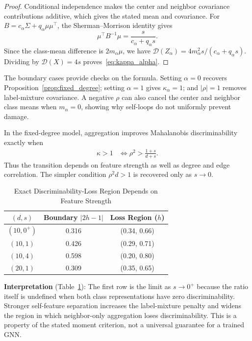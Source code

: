 \begin{proof}
Conditional independence makes the center and neighbor covariance contributions additive, which gives the stated mean and covariance. For
$B=c_\alpha\Sigma+q_\alpha\mu\mu^\top$, the Sherman--Morrison identity gives
\begin{equation}
    \mu^\top B^{-1}\mu=\frac{s}{c_\alpha+q_\alpha s}.
\end{equation}
Since the class-mean difference is $2m_\alpha\mu$, we have
$\mathcal{D}(Z_\alpha)=4m_\alpha^2s/(c_\alpha+q_\alpha s)$. Dividing by $\mathcal{D}(X)=4s$ proves~\eqref{eq:kappa_alpha}.
\end{proof}

The boundary cases provide checks on the formula. Setting $\alpha=0$ recovers Proposition~\ref{prop:fixed_degree}; setting $\alpha=1$ gives $\kappa_\alpha=1$; and $|\rho|=1$ removes label-mixture covariance. A negative $\rho$ can also cancel the center and neighbor class means when $m_\alpha=0$, showing why self-loops do not uniformly prevent damage.

\begin{corollary}
\label{cor:threshold}
In the fixed-degree model, aggregation improves Mahalanobis discriminability exactly when
\begin{align}
    \kappa>1
    &\iff \rho^2 > \frac{1+s}{d+s}.
\end{align}
Thus the transition depends on feature strength as well as degree and edge correlation. The simpler condition $\rho^2d>1$ is recovered only as $s\to0$.
\end{corollary}

\begin{table}[t]
\centering
\caption{Exact Discriminability-Loss Region Depends on Feature Strength}
\label{tab:threshold}
\begin{tabular}{@{}ccc@{}}
\toprule
$(d,s)$ & Boundary $|2h-1|$ & Loss Region ($h$) \\
\midrule
$(10,0^+)$ & 0.316 & (0.34, 0.66) \\
$(10,1)$ & 0.426 & (0.29, 0.71) \\
$(10,4)$ & 0.598 & (0.20, 0.80) \\
$(20,1)$ & 0.309 & (0.35, 0.65) \\
\bottomrule
\end{tabular}
\end{table}

\textbf{Interpretation} (Table~\ref{tab:threshold}): The first row is the limit as $s\to0^+$ because the ratio itself is undefined when both class representations have zero discriminability. Stronger self-feature separation increases the label-mixture penalty and widens the region in which neighbor-only aggregation loses discriminability. This is a property of the stated moment criterion, not a universal guarantee for a trained GNN.

